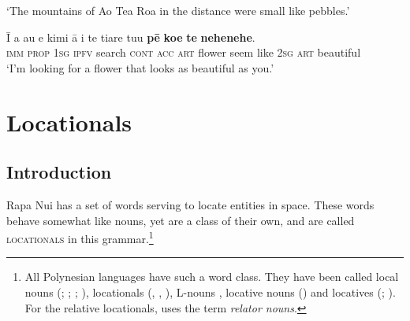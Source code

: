 \glt 
‘The mountains of Ao Tea Roa in the distance were small like pebbles.’ \textstyleExampleref{[R347.078]} 
\z

\ea\label{ex:3.125}
\gll {\ꞌ}Ī a au e kimi {\ꞌ}ā i te tiare tu{\ꞌ}u \textbf{pē} \textbf{koe} \textbf{te} \textbf{nehenehe}. \\
\textsc{imm} \textsc{prop} \textsc{1sg} \textsc{ipfv} search \textsc{cont} \textsc{acc} \textsc{art} flower seem like \textsc{2sg} \textsc{art} beautiful \\

\glt 
‘I’m looking for a flower that looks as beautiful as you.’ \textstyleExampleref{[R433.003–004]}\textstyleExampleref{} 
\z

\section{Locationals}\label{sec:3.6}
\subsection{Introduction}\label{sec:3.6.1}

Rapa Nui has a set of words serving to locate entities in space. These words behave somewhat like nouns, yet are a class of their own, and are called \textsc{locationals} in this grammar.\footnote{\label{fn:138}All Polynesian languages have such a word class. They have been called local nouns (\citealt{Churchward1953}; \citealt{Bauer1997}; \citealt{MoselHovdhaugen1992}; \citealt{Besnier2000}), locationals (\citealt[59]{Clark1976}, \citealt{Clark1986}, \citealt{DuFeu1996}), L-nouns \citep[55]{Clark1976}, locative nouns (\citealt{ElbertPukui1979}) and locatives (\citealt{Biggs1973}; \citealt{Bowden1992}). For the relative locationals, \citet[145]{Harlow2007Maori} uses the term \textit{relator nouns}.} 

